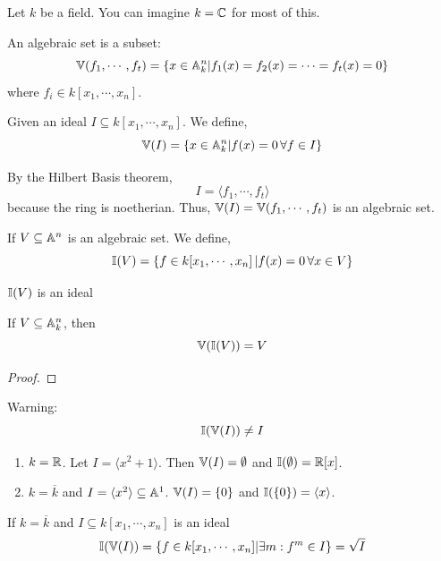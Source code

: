 \documentclass[12pt]{article}
\begin{document}
Let $k$ be a field. You can imagine $k = \mathbb C$ for most of this. 
\begin{definition}
    An algebraic set is a subset: 
    \[ \mathbb V(f_1, \cdots, f_t) = \{ x \in \mathbb A^n_k | f_1(x) = f_2(x) = \cdots = f_t(x) = 0 \}\]
    where $f_i \in k[x_1, \cdots, x_n]$. 
\end{definition}

Given an ideal $I \subseteq k[x_1, \cdots, x_n]$. We define, 
\[ \mathbb V(I) = \{ x \in \mathbb A^n_k | f(x) = 0 \, \forall f \in I\}\]
\begin{remark}
    By the Hilbert Basis theorem,
    \[ I = \langle f_1, \cdots, f_t\rangle\]
    because the ring is noetherian. Thus, $\mathbb V(I) = \mathbb V(f_1, \cdots, f_t)$ is an algebraic set. 
\end{remark}

\begin{definition}
    If $V \subseteq \mathbb A^n$ is an algebraic set. We define, 
    \[ \mathbb I(V) = \{ f \in k[x_1, \cdots, x_n] \, | f(x) = 0 \, \forall x \in V\} \]
\end{definition}

\begin{lemma}
    $\mathbb I(V)$ is an ideal
\end{lemma}

\begin{lemma}
    If $V \subseteq \mathbb A^n_k$, then 
    \[ \mathbb V(\mathbb I(V)) = V\] 
\end{lemma}
\begin{proof}
\end{proof}

Warning: 
\[ \mathbb I(\mathbb V(I)) \neq I\]

\begin{example}
    \begin{enumerate}
        \item $k = \mathbb R$. Let $I = \langle x^2 + 1\rangle$. Then $\mathbb V(I) = \emptyset$ and $\mathbb I(\emptyset) = \mathbb R[x]$. 
        \item $k = \overline{k}$ and $I = \langle x^2 \rangle \subseteq \mathbb A^1$. $\mathbb V(I) = \{0\}$ and $\mathbb I(\{0\}) = \langle x \rangle$. 
    \end{enumerate}    
\end{example}

\begin{proposition}
    If $k = \overline k$ and $I \subseteq k[x_1, \cdots, x_n]$ is an ideal 
    \[ \mathbb I(\mathbb V(I)) = \{f \in k[x_1, \cdots, x_n] | \exists m : f^m \in I \} = \sqrt{I}\]
\end{proposition}
\end{document}
